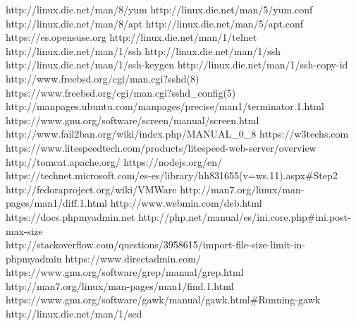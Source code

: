 \newpage
\begin{thebibliography}{xxx}
	 http://linux.die.net/man/8/yum
	 http://linux.die.net/man/5/yum.conf
	 http://linux.die.net/man/8/apt
	 http://linux.die.net/man/5/apt.conf
	 https://es.opensuse.org
	 http://linux.die.net/man/1/telnet
	 http://linux.die.net/man/1/ssh
	 http://linux.die.net/man/1/ssh
	 http://linux.die.net/man/1/ssh-keygen
	 http://linux.die.net/man/1/ssh-copy-id
	 http://www.freebsd.org/cgi/man.cgi?sshd(8)
	 https://www.freebsd.org/cgi/man.cgi?sshd\_config(5)
	 http://manpages.ubuntu.com/manpages/precise/man1/terminator.1.html
	 https://www.gnu.org/software/screen/manual/screen.html
	 http://www.fail2ban.org/wiki/index.php/MANUAL\_0\_8
	 https://w3techs.com
	 https://www.litespeedtech.com/products/litespeed-web-server/overview
	 http://tomcat.apache.org/
	 https://nodejs.org/en/
	 https://technet.microsoft.com/es-es/library/hh831655(v=ws.11).aspx\#Step2
	 http://fedoraproject.org/wiki/VMWare
	 http://man7.org/linux/man-pages/man1/diff.1.html
	 http://www.webmin.com/deb.html
	 https://docs.phpmyadmin.net
	 http://php.net/manual/es/ini.core.php\#ini.post-max-size\\
	http://stackoverflow.com/questions/3958615/import-file-size-limit-in-phpmyadmin
	 https://www.directadmin.com/
	 https://www.gnu.org/software/grep/manual/grep.html
	 http://man7.org/linux/man-pages/man1/find.1.html
	 https://www.gnu.org/software/gawk/manual/gawk.html\#Running-gawk
	 http://linux.die.net/man/1/sed
	
	
\end{thebibliography}
